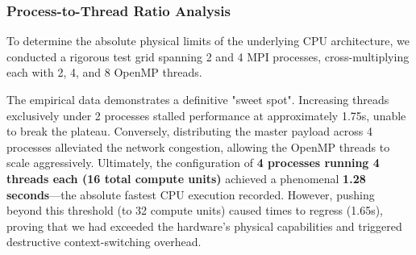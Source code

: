 \documentclass[12pt,a4paper,titlepage]{article}
\begin{document}
\subsubsection*{Process-to-Thread Ratio Analysis}
To determine the absolute physical limits of the underlying CPU architecture, we conducted a rigorous test grid spanning 2 and 4 MPI processes, cross-multiplying each with 2, 4, and 8 OpenMP threads. 

\begin{table}[H]
\centering
{}
\caption{Scaling analysis of Hybrid architecture under intense configurations.}
\label{tab:hybrid_scaling}
\end{table}

The empirical data demonstrates a definitive "sweet spot". Increasing threads exclusively under 2 processes stalled performance at approximately 1.75s, unable to break the plateau. Conversely, distributing the master payload across 4 processes alleviated the network congestion, allowing the OpenMP threads to scale aggressively. Ultimately, the configuration of \textbf{4 processes running 4 threads each (16 total compute units)} achieved a phenomenal \textbf{1.28 seconds}---the absolute fastest CPU execution recorded. However, pushing beyond this threshold (to 32 compute units) caused times to regress (1.65s), proving that we had exceeded the hardware's physical capabilities and triggered destructive context-switching overhead.
\end{document}
